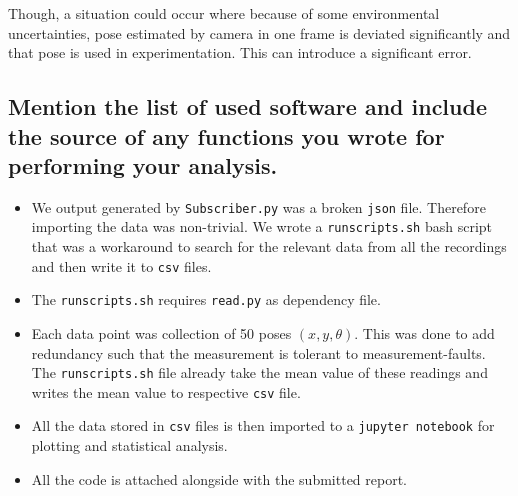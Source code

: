 Though, a situation could occur where because of some environmental uncertainties, pose estimated by camera in one frame is deviated significantly and that pose is used in experimentation. This can introduce a significant error. 

\subsection{Mention the list of used software and include the source of any functions you wrote for performing your analysis.}
\begin{itemize}
\item We output generated by \texttt{Subscriber.py} was a broken \texttt{json} file. Therefore importing the data was non-trivial. We wrote a \texttt{runscripts.sh} bash script that was a workaround to search for the relevant data from all the recordings and then write it to \texttt{csv} files.
\item The \texttt{runscripts.sh} requires \texttt{read.py} as dependency file.
\item Each data point was collection of 50 poses $(x, y, \theta)$. This was done to add redundancy such that the measurement is tolerant to measurement-faults. The \texttt{runscripts.sh} file already take the mean value of these readings and writes the mean value to respective \texttt{csv} file.
\item All the data stored in \texttt{csv} files is then imported to a \texttt{jupyter notebook} for plotting and statistical analysis.
\item All the code is attached alongside with the submitted report.
\end{itemize}


